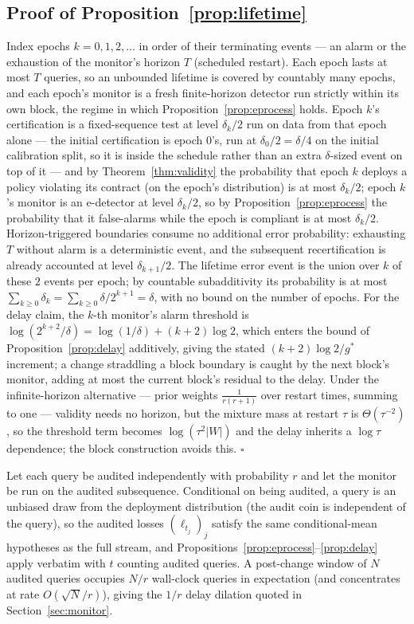 \subsection{Proof of Proposition~\ref{prop:lifetime}}
Index epochs $k = 0, 1, 2, \dots$ in order of their terminating events
--- an alarm or the exhaustion of the monitor's horizon $T$ (scheduled
restart). Each epoch lasts at most $T$ queries, so an unbounded
lifetime is covered by countably many epochs, and each epoch's monitor
is a fresh finite-horizon detector run strictly within its own block,
the regime in which Proposition~\ref{prop:eprocess} holds. Epoch $k$'s
certification is a fixed-sequence test at level
$\delta_k/2$ run on data from that epoch alone --- the initial
certification is epoch 0's, run at $\delta_0/2 = \delta/4$ on the
initial calibration split, so it is inside the schedule rather than an
extra $\delta$-sized event on top of it --- and by
Theorem~\ref{thm:validity} the probability that epoch $k$ deploys a
policy violating its contract (on the epoch's distribution) is at most
$\delta_k/2$; epoch $k$'s monitor is an e-detector at level
$\delta_k/2$, so by Proposition~\ref{prop:eprocess} the probability
that it false-alarms while the epoch is compliant is at most
$\delta_k/2$. Horizon-triggered boundaries consume no additional error
probability: exhausting $T$ without alarm is a deterministic event,
and the subsequent recertification is already accounted at level
$\delta_{k+1}/2$. The lifetime error event is the union over $k$ of
these
$2$ events per epoch; by countable subadditivity its probability is at
most $\sum_{k\ge 0} \delta_k = \sum_{k\ge 0} \delta/2^{k+1} = \delta$,
with no bound on the number of epochs. For the delay claim, the
$k$-th monitor's alarm threshold is $\log(2^{k+2}/\delta) =
\log(1/\delta) + (k+2)\log 2$, which enters the bound of
Proposition~\ref{prop:delay} additively, giving the stated
$(k+2)\log 2 / g^\ast$ increment; a change straddling a block boundary
is caught by the next block's monitor, adding at most the current
block's residual to the delay. Under the infinite-horizon alternative
--- prior weights $\frac{1}{r(r+1)}$ over restart times, summing to
one --- validity needs no horizon, but the mixture mass at restart
$\tau$ is $\Theta(\tau^{-2})$, so the threshold term becomes
$\log(\tau^2 |W|)$ and the delay inherits a $\log\tau$ dependence;
the block construction avoids this. \hfill$\square$

\begin{rmk}
Let each query be audited independently with probability $r$ and let
the monitor be run on the audited subsequence. Conditional on being
audited, a query is an unbiased draw from the deployment distribution
(the audit coin is independent of the query), so the audited losses
$(\ell_{t_j})_j$ satisfy the same conditional-mean hypotheses as the
full stream, and Propositions~\ref{prop:eprocess}--\ref{prop:delay}
apply verbatim with $t$ counting audited queries. A post-change window
of $N$ audited queries occupies $N/r$ wall-clock queries in
expectation (and concentrates at rate $O(\sqrt{N}/r)$), giving the
$1/r$ delay dilation quoted in Section~\ref{sec:monitor}.
\end{rmk}

